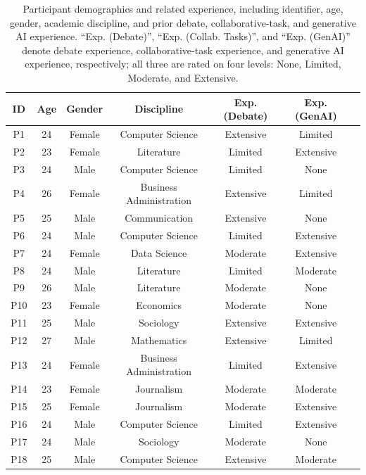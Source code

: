 \documentclass[manuscript,review,anonymous]{acmart}
\begin{document}
\begin{table}[htbp]
\centering
\caption{Participant demographics and related experience, including identifier, age, gender, academic discipline, and prior debate, collaborative-task, and generative AI experience. ``Exp. (Debate)'', ``Exp. (Collab. Tasks)'', and ``Exp. (GenAI)'' denote debate experience, collaborative-task experience, and generative AI experience, respectively; all three are rated on four levels: None, Limited, Moderate, and Extensive.}
\label{tab:participants}
\small
\begin{tabular}{ccccccc}
\toprule
\textbf{ID} & \textbf{Age} & \textbf{Gender} & \textbf{Discipline} & \textbf{Exp. (Debate)} & \textbf{Exp. (GenAI)}\\ \midrule
P1  & 24 & Female & Computer Science & Extensive &  Limited \\
P2  & 23 & Female & Literature & Limited &  Extensive \\
P3  & 24 & Male & Computer Science & Limited &  None \\
P4  & 26 & Female & Business Administration & Extensive &  Limited \\
P5  & 25 & Male & Communication & Extensive &  None \\
P6  & 24 & Male & Computer Science & Limited &  Extensive \\
P7  & 24 & Female & Data Science & Moderate & Extensive \\
P8  & 24 & Male & Literature & Limited & Moderate \\
P9  & 26 & Male & Literature & Moderate & None \\
P10 & 23 & Female & Economics & Moderate & None \\
P11 & 25 & Male & Sociology & Extensive & Extensive \\
P12 & 27 & Male & Mathematics & Extensive & Limited \\
P13 & 24 & Female & Business Administration & Limited & Extensive \\
P14 & 23 & Female & Journalism & Moderate & Moderate \\
P15 & 25 & Female & Journalism & Moderate & Extensive \\
P16 & 24 & Male & Computer Science & Limited & Extensive \\
P17 & 24 & Male & Sociology & Moderate & None \\
P18 & 25 & Male & Computer Science & Extensive & Moderate \\
\bottomrule
\end{tabular}
\end{table}
\end{document}
